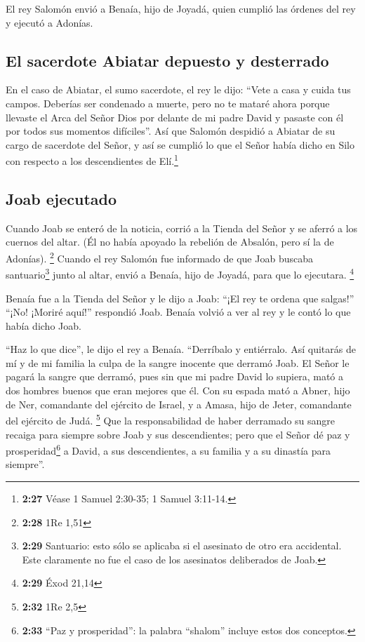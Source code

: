  El rey Salomón envió a Benaía, hijo de Joyadá, quien
cumplió las órdenes del rey y ejecutó a Adonías.

\hypertarget{el-sacerdote-abiatar-depuesto-y-desterrado}{%
\subsection{El sacerdote Abiatar depuesto y
desterrado}\label{el-sacerdote-abiatar-depuesto-y-desterrado}}

 En el caso de Abiatar, el sumo sacerdote, el rey le
dijo: ``Vete a casa y cuida tus campos. Deberías ser condenado a muerte,
pero no te mataré ahora porque llevaste el Arca del Señor Dios por
delante de mi padre David y pasaste con él por todos sus momentos
difíciles''.  Así que Salomón despidió a Abiatar de su
cargo de sacerdote del Señor, y así se cumplió lo que el Señor había
dicho en Silo con respecto a los descendientes de Elí.\footnote{\textbf{2:27}
  Véase 1 Samuel 2:30-35; 1 Samuel 3:11-14.}

\hypertarget{joab-ejecutado}{%
\subsection{Joab ejecutado}\label{joab-ejecutado}}

 Cuando Joab se enteró de la noticia, corrió a la Tienda
del Señor y se aferró a los cuernos del altar. (Él no había apoyado la
rebelión de Absalón, pero sí la de Adonías). \footnote{\textbf{2:28} 1Re
  1,51}  Cuando el rey Salomón fue informado de que Joab
buscaba santuario\footnote{\textbf{2:29} Santuario: esto sólo se
  aplicaba si el asesinato de otro era accidental. Este claramente no
  fue el caso de los asesinatos deliberados de Joab.} junto al altar,
envió a Benaía, hijo de Joyadá, para que lo ejecutara. \footnote{\textbf{2:29}
  Éxod 21,14}

 Benaía fue a la Tienda del Señor y le dijo a Joab: ``¡El
rey te ordena que salgas!'' ``¡No! ¡Moriré aquí!'' respondió Joab.
Benaía volvió a ver al rey y le contó lo que había dicho Joab.

 ``Haz lo que dice'', le dijo el rey a Benaía.
``Derríbalo y entiérralo. Así quitarás de mí y de mi familia la culpa de
la sangre inocente que derramó Joab.  El Señor le pagará
la sangre que derramó, pues sin que mi padre David lo supiera, mató a
dos hombres buenos que eran mejores que él. Con su espada mató a Abner,
hijo de Ner, comandante del ejército de Israel, y a Amasa, hijo de
Jeter, comandante del ejército de Judá. \footnote{\textbf{2:32} 1Re 2,5}
 Que la responsabilidad de haber derramado su sangre
recaiga para siempre sobre Joab y sus descendientes; pero que el Señor
dé paz y prosperidad\footnote{\textbf{2:33} ``Paz y prosperidad'': la
  palabra ``shalom'' incluye estos dos conceptos.} a David, a sus
descendientes, a su familia y a su dinastía para siempre''.

